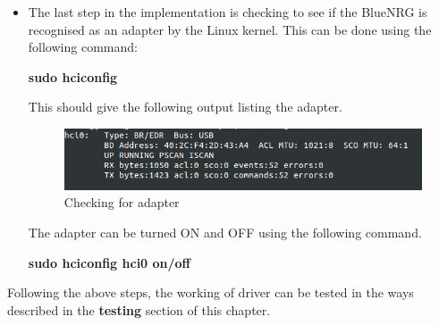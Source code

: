 \begin{itemize}
	\item The last step in the implementation is checking to see if the BlueNRG is recognised as an adapter by the Linux kernel. This can be done using the following command:
	\begin{center}
		\textbf{sudo hciconfig}\\
	\end{center}
	This should give the following output listing the adapter.
	\begin{figure}[ht]
		\centering
		\includegraphics[scale=0.7]{images/adapter_check.png}
		\caption{Checking for adapter}
	\end{figure}
	The adapter can be turned ON and OFF using the following command.
	\begin{center}
		\textbf{sudo hciconfig hci0 on/off}\\
	\end{center}
\end{itemize}
Following the above steps, the working of driver can be tested in the ways described in the \textbf{testing} section of this chapter.

